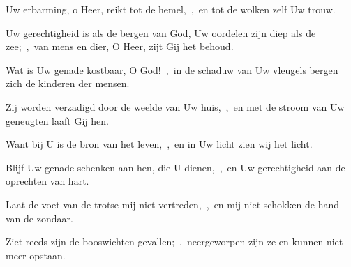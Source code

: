 \documentclass[12pt,twoside,a5paper]{article}
\begin{document}

\begin{halfparskip}
  Uw erbarming, o Heer, reikt tot de hemel,~\sep\ en tot de wolken zelf Uw trouw.

  Uw gerechtigheid is als de bergen van God, Uw oordelen zijn diep als de zee;~\sep\ van mens en dier, O Heer, zijt Gij het behoud.

  Wat is Uw genade kostbaar, O God!~\sep\ in de schaduw van Uw vleugels bergen zich de kinderen der mensen.

  Zij worden verzadigd door de weelde van Uw huis,~\sep\ en met de stroom van Uw geneugten laaft Gij hen.

  Want bij U is de bron van het leven,~\sep\ en in Uw licht zien wij het licht.

  Blijf Uw genade schenken aan hen, die U dienen,~\sep\ en Uw gerechtigheid aan de oprechten van hart.

  Laat de voet van de trotse mij niet vertreden,~\sep\ en mij niet schokken de hand van de zondaar.

  Ziet reeds zijn de booswichten gevallen;~\sep\ neergeworpen zijn ze en kunnen niet meer opstaan.
\end{halfparskip}






\end{document}
